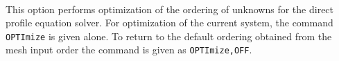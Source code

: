  \\{\smallskip}
\headb

This option performs optimization of the ordering of unknowns for the
direct profile equation solver.  For optimization of the current system,
the command \texttt{OPTImize} is given alone.  To return to the default
ordering obtained from the mesh input order the command is given as
\texttt{OPTImize,OFF}.
\vfill\eject
